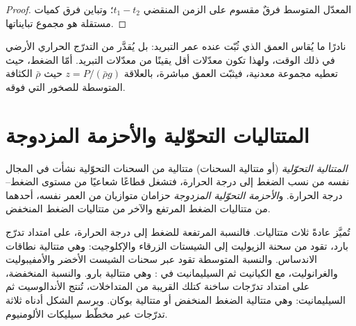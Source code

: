 \begin{proof}
المعدّل المتوسط فرقٌ مقسوم على الزمن المنقضي $t_1 - t_2$؛ وتباين
فرق كميات مستقلة هو مجموع تبايناتها.
\end{proof}

نادرًا ما يُقاس العمق الذي ثُبّت عنده عمر التبريد: بل يُقدَّر من
التدرّج الحراري الأرضي في ذلك الوقت، ولهذا تكون معدّلات  أقل يقينًا من معدّلات التبريد.
أمّا الضغط، حيث تعطيه مجموعة معدنية، فيثبّت العمق مباشرة، بالعلاقة
$z = P/(\bar\rho g)$ حيث $\bar\rho$ الكثافة المتوسطة للصخور التي فوقه.

\section{المتتاليات التحوّلية والأحزمة المزدوجة}\label{sec:b2:pt-paths:series}

\begin{definition}\label{def:b2:pt-paths:series}
\emph{المتتالية التحوّلية} (أو متتالية السحنات) متتالية من
السحنات التحوّلية نشأت في المجال نفسه من نسب الضغط إلى درجة الحرارة،
فتشغل قطاعًا شعاعيًا من مستوى الضغط--درجة الحرارة.
و\emph{الأحزمة التحوّلية المزدوجة} حزامان متوازيان من
العمر نفسه، أحدهما من متتاليات الضغط المرتفع والآخر من متتاليات الضغط المنخفض.
\end{definition}

تُميَّز عادةً ثلاث متتاليات. فالنسبة المرتفعة للضغط إلى درجة الحرارة، على امتداد
تدرّج بارد، تقود من سحنة الزيوليت إلى الشيستات الزرقاء والإكلوجيت: وهي متتالية
نطاقات الاندساس. والنسبة المتوسطة تقود عبر سحنات الشيست الأخضر والأمفيبوليت
والغرانوليت، مع الكيانيت ثم السيليمانيت في : وهي متتالية بارو. والنسبة
المنخفضة، على امتداد تدرّجات ساخنة كتلك القريبة من المتداخلات، تُنتج الأندالوسيت ثم
السيليمانيت: وهي متتالية الضغط المنخفض أو متتالية بوكان. ويرسم الشكل أدناه ثلاثة تدرّجات
عبر مخطّط سيليكات الألومنيوم.

